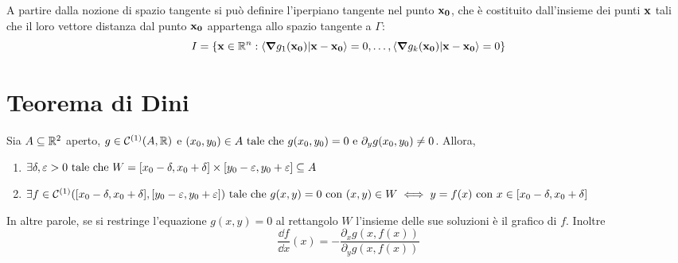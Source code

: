 \begin{definition}
    A partire dalla nozione di spazio tangente si può definire l'iperpiano tangente nel punto $\vb{x_0}$, che è costituito dall'insieme dei punti $\vb{x}$ tali che il loro vettore distanza dal punto $\vb{x_0}$ appartenga allo spazio tangente a $\Gamma$:
    $$
        I= \{ \vb{x} \in \R^n :  \ip{\grad g_1(\vb{x_0})}{\vb{x}-\vb{x_0}}=0,\dots,\ip{\grad g_k(\vb{x_0})}{\vb{x}-\vb{x_0}}=0 \}
    $$
\end{definition}

\section{Teorema di Dini}

\begin{theorem}
    Sia $A \subseteq \mathbb{R}^2$ aperto, $g \in \mathcal{C}^{(1)}(A, \mathbb{R})$ e $(x_0,y_0) \in A \text{ tale che } g(x_0, y_0)=0 \text{ e } \partial_y g(x_0,y_0)\neq 0$.
    Allora,
    \begin{enumerate}
        \item $\exists \delta, \varepsilon>0 \text{ tale che } W=[x_0-\delta,x_0+\delta]\times[y_0-\varepsilon,y_0+\varepsilon] \subseteq A$
        \item $\exists f \in \mathcal{C}^{(1)}([x_0-\delta,x_0+\delta],[y_0-\varepsilon,y_0+\varepsilon]) \text{ tale che } g(x,y)=0 \text{ con } (x,y) \in W \iff y=f(x) \text{ con } x \in [x_0-\delta,x_0+\delta]$
    \end{enumerate}
    In altre parole, se si restringe l'equazione $g(x,y)=0$ al rettangolo $W$ l'insieme delle sue soluzioni è il grafico di $f$. Inoltre
    $$
        \frac{\dd f}{\dd x}(x)=-\frac{\partial_x g(x,f(x))}{\partial_y g(x,f(x))}
    $$
\end{theorem}

